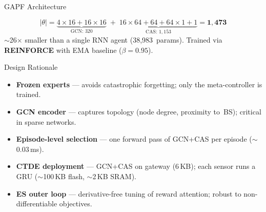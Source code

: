 \documentclass[final]{beamer}
\newlength{\colwidth}
\begin{document}
\begin{frame}[t]
\begin{columns}[t]
\begin{column}{\colwidth}
\begin{block}{GAPF Architecture}
\begin{center}
    \end{center}

    \begin{equation*}
      |\theta|
      = \underbrace{4\!\times\!16 + 16\!\times\!16}_{\text{GCN: }320}
      \;+\;
      \underbrace{16\!\times\!64 + 64 + 64\!\times\!1 + 1}_{\text{CAS: }1{,}153}
      = \mathbf{1{,}473}
    \end{equation*}
    $\sim$26$\times$ smaller than a single RNN agent (38,983~params).
    Trained via \textbf{REINFORCE} with EMA baseline ($\beta\!=\!0.95$).
  \end{block}

  \begin{block}{Design Rationale}
    \begin{itemize}
      \item \textbf{Frozen experts} --- avoids catastrophic forgetting; only the meta-controller is trained.
      \item \textbf{GCN encoder} --- captures topology (node degree, proximity to~BS); critical in sparse networks.
      \item \textbf{Episode-level selection} --- one forward pass of GCN+CAS per episode ($\sim$0.03\,ms).
      \item \textbf{CTDE deployment} --- GCN+CAS on gateway (6\,KB); each sensor runs a GRU ($\sim$100\,KB flash, $\sim$2\,KB SRAM).
      \item \textbf{ES outer loop} --- derivative-free tuning of reward attention; robust to non-differentiable objectives.
    \end{itemize}
  \end{block}


\end{column}
\end{columns}
\end{frame}
\end{document}
